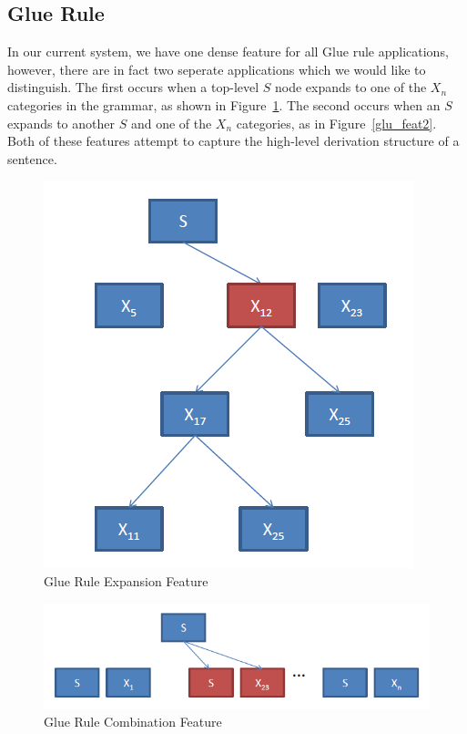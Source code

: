 \subsection{Glue Rule}
In our current system, we have one dense feature for all Glue rule applications, however, there are in fact two seperate applications which we would like to distinguish. The first occurs when a top-level $S$ node expands to one of the $X_n$ categories in the grammar, as shown in Figure~\ref{fig:glu_feat}. The second occurs when an $S$ expands to another $S$ and one of the $X_n$ categories, as in Figure~\ref{glu_feat2}. Both of these features attempt to capture the high-level derivation structure of a sentence. 

\begin{figure}[h]
	\centering
		\includegraphics[scale=0.5]{training_img_files/glu_feat.PNG}
	\caption{Glue Rule Expansion Feature}
	\label{fig:glu_feat}
\end{figure}


\begin{figure}[h]
	\centering
		\includegraphics[scale=0.5]{training_img_files/glu_feat2.PNG}
	\caption{Glue Rule Combination Feature}
	\label{fig:glu_feat2}
\end{figure}

